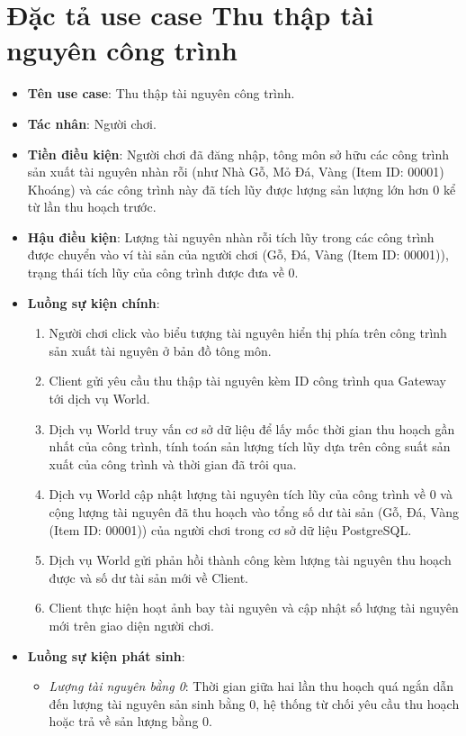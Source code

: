 \documentclass[../Project.tex]{subfiles}
\begin{document}
\section{Đặc tả use case Thu thập tài nguyên công trình}
\label{sec:spec_collect}
\begin{itemize}
    \item \textbf{Tên use case}: Thu thập tài nguyên công trình.
    \item \textbf{Tác nhân}: Người chơi.
    \item \textbf{Tiền điều kiện}: Người chơi đã đăng nhập, tông môn sở hữu các công trình sản xuất tài nguyên nhàn rỗi (như Nhà Gỗ, Mỏ Đá, Vàng (Item ID: 00001) Khoáng) và các công trình này đã tích lũy được lượng sản lượng lớn hơn 0 kể từ lần thu hoạch trước.
    \item \textbf{Hậu điều kiện}: Lượng tài nguyên nhàn rỗi tích lũy trong các công trình được chuyển vào ví tài sản của người chơi (Gỗ, Đá, Vàng (Item ID: 00001)), trạng thái tích lũy của công trình được đưa về 0.
    \item \textbf{Luồng sự kiện chính}:
    \begin{enumerate}
        \item Người chơi click vào biểu tượng tài nguyên hiển thị phía trên công trình sản xuất tài nguyên ở bản đồ tông môn.
        \item Client gửi yêu cầu thu thập tài nguyên kèm ID công trình qua Gateway tới dịch vụ World.
        \item Dịch vụ World truy vấn cơ sở dữ liệu để lấy mốc thời gian thu hoạch gần nhất của công trình, tính toán sản lượng tích lũy dựa trên công suất sản xuất của công trình và thời gian đã trôi qua.
        \item Dịch vụ World cập nhật lượng tài nguyên tích lũy của công trình về 0 và cộng lượng tài nguyên đã thu hoạch vào tổng số dư tài sản (Gỗ, Đá, Vàng (Item ID: 00001)) của người chơi trong cơ sở dữ liệu PostgreSQL.
        \item Dịch vụ World gửi phản hồi thành công kèm lượng tài nguyên thu hoạch được và số dư tài sản mới về Client.
        \item Client thực hiện hoạt ảnh bay tài nguyên và cập nhật số lượng tài nguyên mới trên giao diện người chơi.
    \end{enumerate}
    \item \textbf{Luồng sự kiện phát sinh}:
    \begin{itemize}
        \item \textit{Lượng tài nguyên bằng 0}: Thời gian giữa hai lần thu hoạch quá ngắn dẫn đến lượng tài nguyên sản sinh bằng 0, hệ thống từ chối yêu cầu thu hoạch hoặc trả về sản lượng bằng 0.
    \end{itemize}
\end{itemize}
\end{document}
